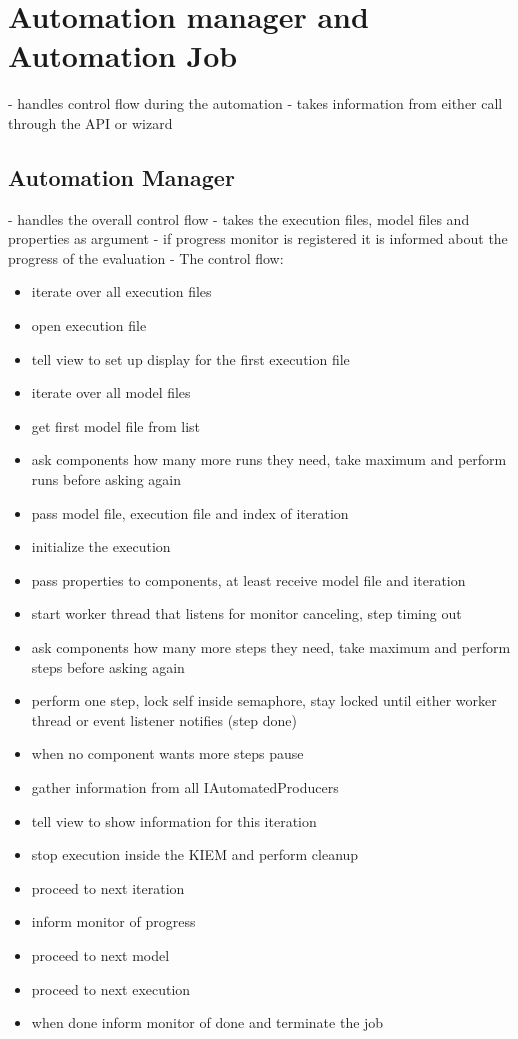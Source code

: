 \section{Automation manager and Automation Job}
- handles control flow during the automation
- takes information from either call through the API or wizard

\subsection{Automation Manager}
- handles the overall control flow
- takes the execution files, model files and properties as argument
- if progress monitor is registered it is informed about the progress of the evaluation
- The control flow:
\begin{itemize}
 \item iterate over all execution files
 \item open execution file
 \item tell view to set up display for the first execution file
 \item iterate over all model files
 \item get first model file from list
 \item ask components how many more runs they need, take maximum and perform runs before asking again
 \item pass model file, execution file and index of iteration
 \item initialize the execution
 \item pass properties to components, at least receive model file and iteration
 \item start worker thread that listens for monitor canceling, step timing out
 \item ask components how many more steps they need, take maximum and perform steps before asking again
 \item perform one step, lock self inside semaphore, stay locked until either worker thread or event listener notifies (step done)
 \item when no component wants more steps pause
 \item gather information from all IAutomatedProducers
 \item tell view to show information for this iteration
 \item stop execution inside the KIEM and perform cleanup
 \item proceed to next iteration
 \item inform monitor of progress
 \item proceed to next model
 \item proceed to next execution
 \item when done inform monitor of done and terminate the job
\end{itemize}



